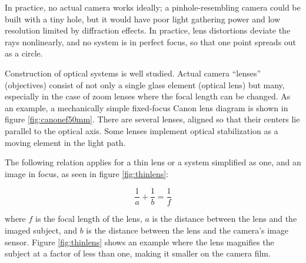 
In practice, no actual camera works ideally; a pinhole-resembling camera could be built with a tiny hole, but it would have poor light gathering power and low resolution limited by diffraction effects. \cite{todo}
In practice, lens distortions deviate the rays nonlinearly, and no system is in perfect focus, so that one point spreads out as a circle.

Construction of optical systems is well studied. \cite{kingslake1989history,greenleaf1950photographic}
Actual camera ``lenses'' (objectives) consist of not only a single glass element (optical lens) but many, especially in the case of zoom lenses where the focal length can be changed.
As an example, a mechanically simple fixed-focus Canon lens diagram is shown in figure \ref{fig:canonef50mm}.
There are several lenses, aligned so that their centers lie parallel to the optical axis.
Some lenses implement optical stabilization as a moving element in the light path.




The following relation applies for a thin lens or a system simplified as one, and an image in focus, as seen in figure \ref{fig:thinlens}:

\begin{equation}
	\frac{1}{a} + \frac{1}{b} = \frac{1}{f} \label{eq:focal}
\end{equation}


where $f$ is the focal length of the lens, $a$ is the distance between the lens and the imaged subject, and $b$ is the distance between the lens and the camera's image sensor. Figure \ref{fig:thinlens} shows an example where the lens magnifies the subject at a factor of less than one, making it smaller on the camera film.

